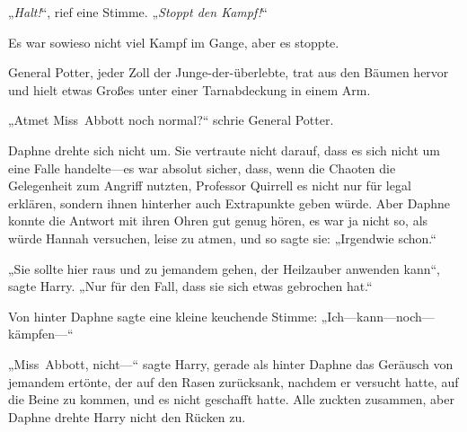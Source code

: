 „\emph{Halt!}“, rief eine Stimme. „\emph{Stoppt den Kampf!}“

Es war sowieso nicht viel Kampf im Gange, aber es stoppte.

General Potter, jeder Zoll der Junge-der-überlebte, trat aus den Bäumen hervor und hielt etwas Großes unter einer Tarnabdeckung in einem Arm.

„Atmet Miss~Abbott noch normal?“ schrie General Potter.

Daphne drehte sich nicht um. Sie vertraute nicht darauf, dass es sich nicht um eine Falle handelte—es war absolut sicher, dass, wenn die Chaoten die Gelegenheit zum Angriff nutzten, Professor Quirrell es nicht nur für legal erklären, sondern ihnen hinterher auch Extrapunkte geben würde. Aber Daphne konnte die Antwort mit ihren Ohren gut genug hören, es war ja nicht so, als würde Hannah versuchen, leise zu atmen, und so sagte sie: „Irgendwie schon.“

„Sie sollte hier raus und zu jemandem gehen, der Heilzauber anwenden kann“, sagte Harry. „Nur für den Fall, dass sie sich etwas gebrochen hat.“

Von hinter Daphne sagte eine kleine keuchende Stimme: „Ich—kann—noch—kämpfen—“

„Miss~Abbott, nicht—“ sagte Harry, gerade als hinter Daphne das Geräusch von jemandem ertönte, der auf den Rasen zurücksank, nachdem er versucht hatte, auf die Beine zu kommen, und es nicht geschafft hatte. Alle zuckten zusammen, aber Daphne drehte Harry nicht den Rücken zu.

